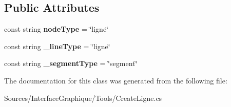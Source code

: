 \subsection*{Public Attributes}
\begin{DoxyCompactItemize}
\item 
\hypertarget{class_interface_graphique_1_1_tools_1_1_create_ligne_abe729b1a7fadece9f5b3f81dff5f994b}{}const string {\bfseries node\+Type} = \char`\"{}ligne\char`\"{}\label{class_interface_graphique_1_1_tools_1_1_create_ligne_abe729b1a7fadece9f5b3f81dff5f994b}

\item 
\hypertarget{class_interface_graphique_1_1_tools_1_1_create_ligne_a04a49a2d6b009b037285af88ea7a2ecb}{}const string {\bfseries \+\_\+line\+Type} = \char`\"{}ligne\char`\"{}\label{class_interface_graphique_1_1_tools_1_1_create_ligne_a04a49a2d6b009b037285af88ea7a2ecb}

\item 
\hypertarget{class_interface_graphique_1_1_tools_1_1_create_ligne_a4aa675b1aec1314dac9e2793e078476e}{}const string {\bfseries \+\_\+segment\+Type} = \char`\"{}segment\char`\"{}\label{class_interface_graphique_1_1_tools_1_1_create_ligne_a4aa675b1aec1314dac9e2793e078476e}

\end{DoxyCompactItemize}


The documentation for this class was generated from the following file\+:\begin{DoxyCompactItemize}
\item 
Sources/\+Interface\+Graphique/\+Tools/Create\+Ligne.\+cs\end{DoxyCompactItemize}
